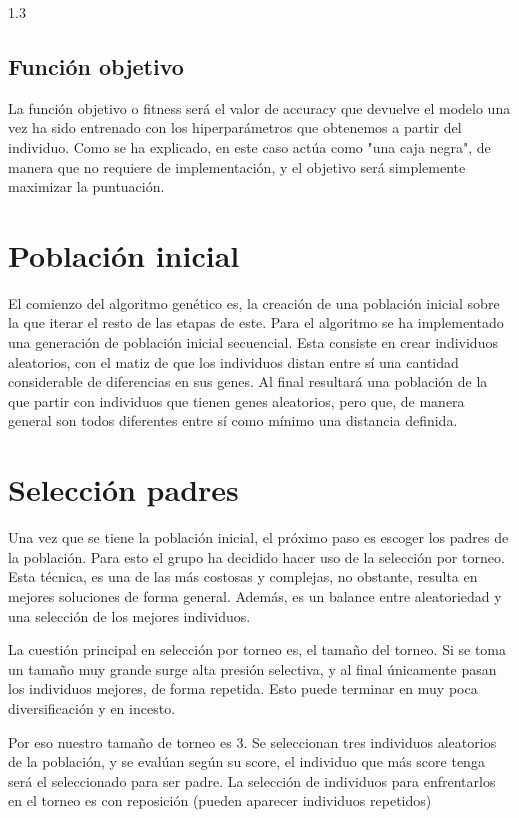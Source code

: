 \documentclass{article}
\begin{document}
\begin{spacing}{1.3}
\subsection{Función objetivo}
La función objetivo o fitness será el valor de accuracy que devuelve el modelo una vez ha sido entrenado con los hiperparámetros
que obtenemos a partir del individuo. Como se ha explicado, en este caso actúa como "una caja negra", de manera que no requiere de implementación, y el objetivo será simplemente
maximizar la puntuación.


\section{Población inicial}

El comienzo del algoritmo genético es, la creación de una población inicial sobre la que iterar el resto de las etapas
de este. Para el algoritmo se ha implementado una generación de población
inicial secuencial. Esta consiste en crear individuos aleatorios, con el matiz de que los individuos distan entre sí una
cantidad considerable de diferencias en sus genes. Al final resultará una población de la que partir con individuos que tienen
genes aleatorios, pero que, de manera general son todos diferentes entre sí como mínimo una distancia definida.\newline



\section{Selección padres}

Una vez que se tiene la población inicial, el próximo paso es escoger los padres de la población. Para esto el grupo ha decidido
hacer uso de la selección por torneo. Esta técnica, es una de las más costosas y complejas, no obstante, resulta en mejores soluciones de forma general.
Además, es un balance entre aleatoriedad y una selección de los mejores individuos. \newline

La cuestión principal en selección por torneo es, el tamaño del torneo. Si se toma un tamaño muy grande surge alta presión selectiva,
y al final únicamente pasan los individuos mejores, de forma repetida. Esto puede terminar en muy poca diversificación y en incesto.

Por eso nuestro tamaño de torneo es 3. Se seleccionan tres individuos aleatorios de la población, y se evalúan según su score,
el individuo que más score tenga será el seleccionado para ser padre. La selección de individuos para enfrentarlos en el torneo es
con reposición (pueden aparecer individuos repetidos)


\end{spacing}
\end{document}

